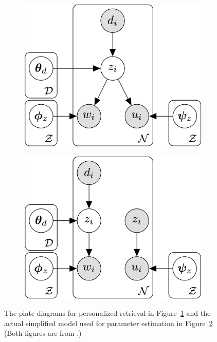 \begin{figure}
  \begin{center}
  \begin{subfigure}{.5\textwidth}
  \centering
  \includegraphics[width=0.8\linewidth]{figures/ptm}
  \caption{}
  \label{fig:ptm-original}
  \end{subfigure}%
  \begin{subfigure}{.5\textwidth}
  \centering
  \includegraphics[width=0.8\linewidth]{figures/ptm-simplified}
  \caption{}
  \label{fig:ptm-simplified}
  \end{subfigure}
  \end{center}
  \caption{ The plate diagrams for personalized retrieval in
    Figure~\ref{fig:ptm-original} and the actual simplified model used
    for parameter estimation in Figure~\ref{fig:ptm-simplified} (Both
    figures are from \citet{Harvey-2013}.)}
  \label{fig:ptm}
\end{figure}

